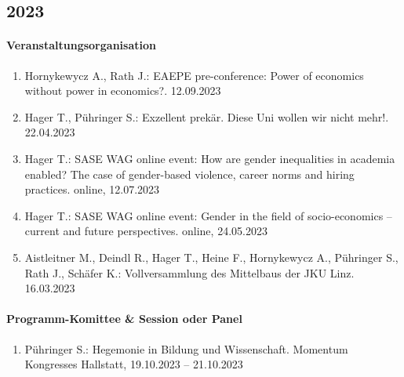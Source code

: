 \subsection*{2023}
\paragraph{Veranstaltungsorganisation}
\begin{enumerate}[leftmargin=*, labelsep=0.5cm]
\item Hornykewycz A., Rath J.: EAEPE pre-conference: Power of economics without power in economics?. 12.09.2023
\item Hager T., Pühringer S.: Exzellent prekär. Diese Uni wollen wir nicht mehr!. 22.04.2023
\item Hager T.: SASE WAG online event: How are gender inequalities in academia enabled? The case of gender-based violence, career norms and hiring practices. online, 12.07.2023
\item Hager T.: SASE WAG online event: Gender in the field of socio-economics – current and future perspectives. online, 24.05.2023
\item Aistleitner M., Deindl R., Hager T., Heine F., Hornykewycz A., Pühringer S., Rath J., Schäfer K.: Vollversammlung des Mittelbaus der JKU Linz. 16.03.2023
\end{enumerate}

\paragraph{Programm-Komittee \& Session oder Panel}
\begin{enumerate}[leftmargin=*, labelsep=0.5cm]
\item Pühringer S.: Hegemonie in Bildung und Wissenschaft. Momentum Kongresses Hallstatt, 19.10.2023 -- 21.10.2023
\end{enumerate}

